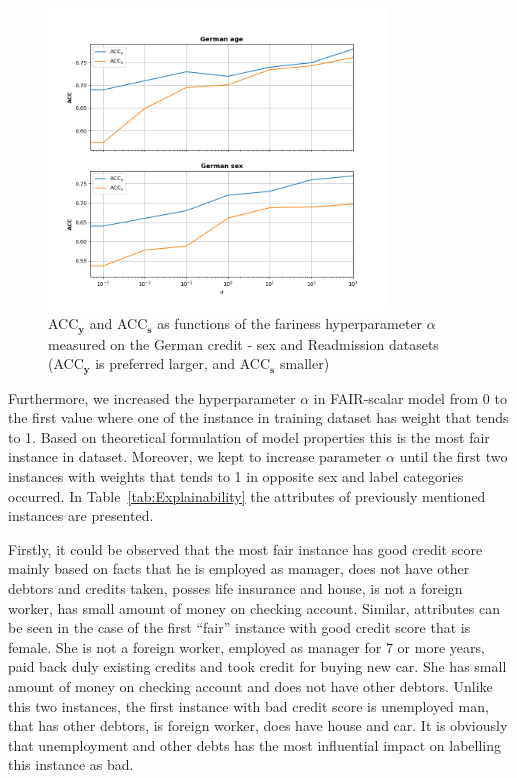 \documentclass[preprint,12pt]{elsarticle}
\begin{document}
\begin{figure}[h]
	\center
	\includegraphics[angle=0, width=0.8\textwidth]{AUC_y_A.png}
	\captionsetup{justification=centering}
	\caption{ACC$_\mathbf{y}$ and ACC$_\mathbf{s}$ as functions of the fariness hyperparameter $\alpha$ measured on the German credit - sex and Readmission datasets (ACC$_\mathbf{y}$ is preferred larger, and ACC$_\mathbf{s}$ smaller)}
	\label{fig:FigResultsAlpha}
\end{figure}

Furthermore, we increased the hyperparameter $\alpha$ in FAIR-scalar model from 0 to the first value where one of the instance in training dataset has weight that tends to 1. Based on theoretical formulation of model properties this is the most fair instance in dataset. Moreover, we kept to increase parameter $\alpha$ until the first two instances with weights that tends to 1 in opposite sex and label categories occurred. In Table~\ref{tab:Explainability} the attributes of previously mentioned instances are presented.

Firstly, it could be observed that the most fair instance has good credit score mainly based on facts that he is employed as manager, does not have other debtors and credits taken, posses life insurance and house, is not a foreign worker, has small amount of money on checking account. Similar, attributes can be seen in the case of the first ``fair'' instance with good credit score that is female. She is not a foreign worker, employed as manager for 7 or more years, paid back duly existing credits and took credit for buying new car. She has small amount of money on checking account and does not have other debtors. Unlike this two instances, the first instance with bad credit score is unemployed man, that has other debtors, is foreign worker, does have house and car. It is obviously that unemployment and other debts has the most influential impact on labelling this instance as bad.
\end{document}

